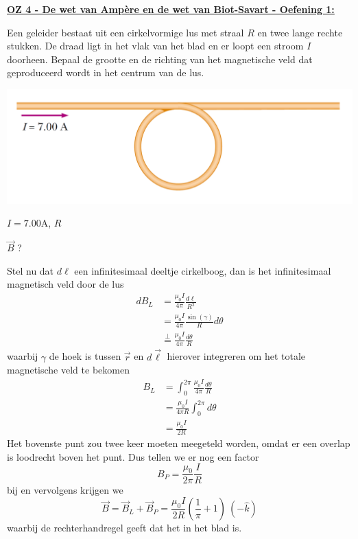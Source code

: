 \textbf{\underline{OZ 4 - De wet van Ampère en de wet van Biot-Savart - Oefening 1:}}
\vspace{0.5cm}

Een geleider bestaat uit een cirkelvormige lus met straal $R$ en twee lange rechte stukken. De draad ligt in het vlak van het blad en er loopt een stroom $I$ doorheen. Bepaal de grootte en de richting van het magnetische veld dat geproduceerd wordt in het centrum van de lus.

\begin{center}
    \includegraphics[scale = 0.5]{oz04/resources/Oz4Oef1.png}
\end{center}

\begin{description}[labelwidth=1.5cm, leftmargin=!]
    \item[Geg. :]   $I = 7.00$A, $R$
    \item[Gevr. :]  $\Vec{B}$ ?
    \item[Opl. :]  
    Stel nu dat $d\ell$ een infinitesimaal deeltje cirkelboog, dan is het infinitesimaal magnetisch veld door de lus
    \begin{align*}
        dB_L
            &= \frac{\mu_0I}{4\pi}\frac{d\ell}{R^2} \\
            &= \frac{\mu_0I}{4\pi}\frac{\sin(\gamma)}{R}d\theta \\
            &\overset{\perp}{=} \frac{\mu_0I}{4\pi}\frac{d\theta}{R} 
    \end{align*}
    waarbij $\gamma$ de hoek is tussen $\Vec{r}$ en $d\Vec{\ell}$ hierover integreren om het totale magnetische veld te bekomen
    \begin{align*}
        B_L
            &= \int_{0}^{2\pi} \frac{\mu_0I}{4\pi}\frac{d\theta}{R}  \\
            &= \frac{\mu_0I}{4\pi R} \int_{0}^{2\pi}d\theta \\
            &=  \frac{\mu_0I}{2R}
    \end{align*}
    Het bovenste punt zou twee keer moeten meegeteld worden, omdat er een overlap is loodrecht boven het punt. Dus tellen we er nog een factor
    \begin{equation*}
        B_P = \frac{\mu_0}{2\pi}\frac{I}{R}
    \end{equation*}
    bij en vervolgens krijgen we
    \begin{equation*}
        \Vec{B} = \Vec{B}_L + \Vec{B}_P = \frac{\mu_0I}{2R}\left(\frac{1}{\pi} + 1\right) \ (-\hat{k})
    \end{equation*}
    waarbij de rechterhandregel geeft dat het in het blad is.
\end{description}

\vspace{1cm}